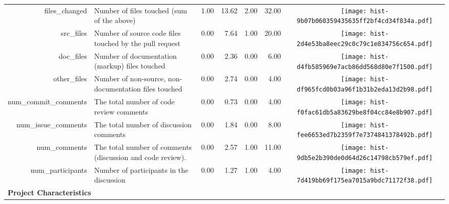 \begin{table*}[t]
\begin{smaller}
\begin{tabular}{rp{29em}rrrrc}
  files\_changed & Number of files touched (sum of the above) & 1.00 & 13.62 & 2.00 & 32.00 & \texttt{[image: hist-9b07b060359435635ff2bf4cd34f834a.pdf]} \\ 
  src\_files & Number of source code files touched by the pull request & 0.00 & 7.64 & 1.00 & 20.00 & \texttt{[image: hist-2d4e53ba8eec29c0c79c1e834756c654.pdf]} \\ 
  doc\_files & Number of documentation (markup) files touched & 0.00 & 2.36 & 0.00 & 6.00 & \texttt{[image: hist-d4fb585969e7acb86dd568d80e7f1500.pdf]} \\ 
  other\_files & Number of non-source, non-documentation files touched & 0.00 & 2.74 & 0.00 & 4.00 & \texttt{[image: hist-df965fcd0b03a96f1b31b2eda13d2b98.pdf]} \\ 
  num\_commit\_comments & The total number of code review comments & 0.00 & 0.73 & 0.00 & 4.00 & \texttt{[image: hist-f0fac61db5a83629be8f04cc84e8b907.pdf]} \\ 
  num\_issue\_comments & The total number of discussion comments & 0.00 & 1.84 & 0.00 & 8.00 & \texttt{[image: hist-fee6653ed7b2359f7e7374841378492b.pdf]} \\ 
  num\_comments & The total number of comments (discussion and code review). & 0.00 & 2.57 & 1.00 & 11.00 & \texttt{[image: hist-9db5e2b390de0d64d26c14798cb579ef.pdf]} \\ 
  num\_participants & Number of participants in the discussion & 0.00 & 1.27 & 1.00 & 4.00 & \texttt{[image: hist-7d419bb69f175ea7015a9bdc71172f38.pdf]} \\ 
  \multicolumn{2}{l}{\bf{Project Characteristics}}\\
  

\end{tabular}
\end{smaller}
\end{table*}
